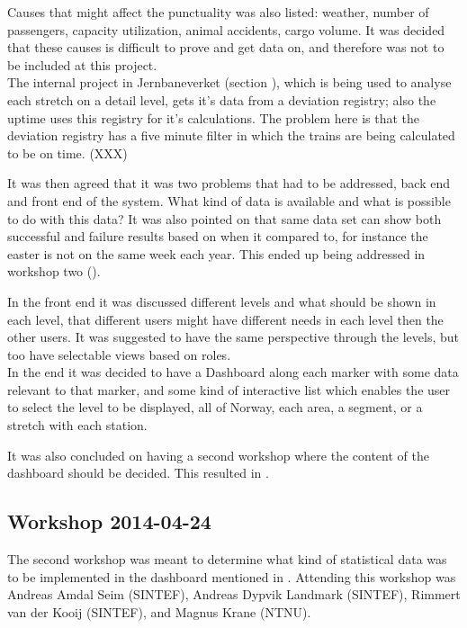 Causes that might affect the punctuality was also listed: weather, number of
passengers, capacity utilization, animal accidents, cargo volume.
It was decided that these causes is difficult to prove and get data on, and
therefore was not to be included at this project.\\

The internal project in Jernbaneverket (section
), which is being used to analyse each
stretch on a detail level, gets it's data from a deviation registry; also the
uptime uses this registry for it's calculations. The problem here is that the deviation registry has a five minute filter
in which the trains are being calculated to be on time. (XXX)

It was then agreed that it was two problems that had to be addressed, back end
and front end of the system. What kind of data is available and what is
possible to do with this data? It was also pointed on that same data set can 
show both successful and failure results based on when it compared to, for 
instance the easter is not on the same week each year. This ended up being 
addressed in workshop two (). 

In the front end it was discussed different levels and what should be shown in
each level, that different users might have different needs in each level then
the other users. It was suggested to have the same perspective through the
levels, but too have selectable views based on roles. \\

In the end it was decided to have a Dashboard along each marker with some data
relevant to that marker, and some kind of interactive list which enables the
user to select the level to be displayed, all of Norway, each area, a segment,
or a stretch with each station. 

It was also concluded on having a second workshop where the content of the
dashboard should be decided. This resulted in .


\clearpage
\subsection{Workshop 2014-04-24} %
\label{sub:workshop_2014_04_24}
The second workshop was meant to determine what kind of statistical data was 
to be implemented in the dashboard mentioned in .
Attending this workshop was Andreas Amdal Seim (SINTEF), Andreas Dypvik 
Landmark (SINTEF), Rimmert van der Kooij (SINTEF), and Magnus Krane (NTNU).\\

